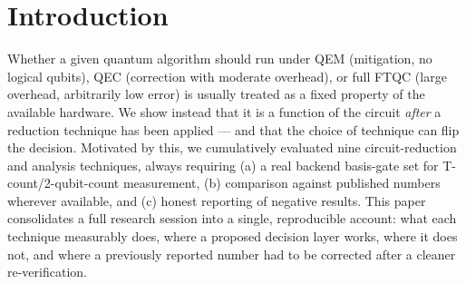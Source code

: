 \documentclass[9pt,twocolumn]{extarticle}
\begin{document}
\section{Introduction}
Whether a given quantum algorithm should run under QEM (mitigation, no
logical qubits), QEC (correction with moderate overhead), or full FTQC (large
overhead, arbitrarily low error) is usually treated as a fixed property of
the available hardware. We show instead that it is a function of the circuit
\emph{after} a reduction technique has been applied --- and that the choice
of technique can flip the decision. Motivated by this, we cumulatively
evaluated nine circuit-reduction and analysis techniques, always requiring
(a) a real backend basis-gate set for T-count/2-qubit-count measurement, (b)
comparison against published numbers wherever available, and (c) honest
reporting of negative results. This paper consolidates a full research
session into a single, reproducible account: what each technique measurably
does, where a proposed decision layer works, where it does not, and where a
previously reported number had to be corrected after a cleaner
re-verification.
\end{document}

